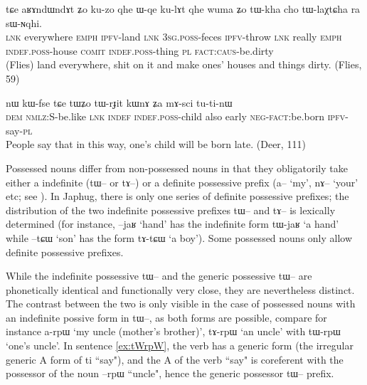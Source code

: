 \documentclass[oldfontcommands,oneside,a4paper,11pt]{article}
\newcommand{\ipa}[1]{{\phon \mbox{#1}}} %
\begin{document}
\begin{exe}
\ex \label{ex:tWlaXtCha}
\gll 
\ipa{tɕe}  	\ipa{aʁɤndɯndɤt}  	\ipa{ʑo}  	\ipa{ku-zo}  	\ipa{qhe}  	\ipa{ɯ-qe}  	\ipa{ku-lɤt}  	\ipa{qhe}	\ipa{wuma}  	\ipa{ʑo}  	\ipa{tɯ-kha}  	\ipa{cho}  	\ipa{tɯ-laχtɕha}  	\ipa{ra}  	\ipa{sɯ-ɴqhi.}  \\
\textsc{lnk} everywhere \textsc{emph} \textsc{ipfv}-land \textsc{lnk} \textsc{3sg.poss}-feces \textsc{ipfv}-throw \textsc{lnk} really \textsc{emph} \textsc{indef.poss}-house \textsc{comit} \textsc{indef.poss}-thing \textsc{pl} \textsc{fact:caus}-be.dirty \\
\glt (Flies) land everywhere, shit on it and make ones' houses and things dirty. (Flies, 59)
\end{exe}




\begin{exe}
\ex
\gll
\ipa{nɯ} 	\ipa{kɯ-fse} 	\ipa{tɕe} 	\ipa{tɯʑo} 	\ipa{tɯ-rɟit} 	\ipa{kɯnɤ} 	\ipa{ʑa} 	\ipa{mɤ-sci} 	\ipa{tu-ti-nɯ} \\
\textsc{dem} \textsc{nmlz}:S-be.like \textsc{lnk} \textsc{indef} \textsc{indef.poss}-child also early \textsc{neg-fact}:be.born \textsc{ipfv}-say-\textsc{pl} \\
\glt People say that in this way, one's child will be born late. (Deer, 111)
\end{exe}



Possessed nouns differ from non-possessed nouns in that they obligatorily take either a indefinite  (\ipa{tɯ--} or \ipa{tɤ--})  or a definite possessive prefix (\ipa{a--} `my', \ipa{nɤ--} `your' etc; see \citealt{jacques14antipassive}). In Japhug, there is only one series of definite possessive prefixes; the distribution of the two indefinite possessive prefixes \ipa{tɯ--} and \ipa{tɤ--} is lexically determined (for instance, \ipa{--jaʁ} `hand' has the indefinite form \ipa{tɯ-jaʁ} `a hand' while \ipa{--tɕɯ} `son' has the form \ipa{tɤ-tɕɯ} `a boy'). Some possessed nouns only allow definite possessive prefixes.

While the indefinite possessive \ipa{tɯ--} and the generic possessive \ipa{tɯ--} are phonetically identical and functionally very close, they are nevertheless distinct. The contrast between the two is only visible in the case of possessed nouns with an indefinite possive form in \ipa{tɯ--}, as both forms are possible, compare for instance \ipa{a-rpɯ} `my uncle (mother's brother)', \ipa{tɤ-rpɯ} `an uncle' with \ipa{tɯ-rpɯ} `one's uncle'. In sentence \ref{ex:tWrpW}, the verb has a generic form (the irregular generic A form of \ipa{ti} ``say"), and the A of the verb ``say" is coreferent with the possessor of the noun   \ipa{--rpɯ}  ``uncle", hence the generic possessor \ipa{tɯ--} prefix.
\end{document}
